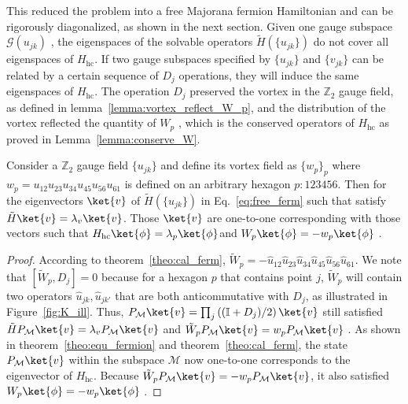 This reduced the problem into a free Majorana fermion Hamiltonian and can be rigorously diagonalized, as shown in the next section.
Given one gauge subspace $\mathcal{G}(u_{jk}) $ , the eigenspaces of the solvable operators $\tilde H(\{u_{jk}\})$ do not cover all eigenspaces of $H_{\mathrm{hc}}$.  
If two gauge subspaces specified by $\{u_{jk}\}$ and $\{v_{jk}\}$ can be related by a certain sequence of $D_j$ operations, they will induce the same eigenspaces of $H_{\mathrm{hc}}$.
The operation $D_j$ preserved the vortex in the $\mathbb{Z}_2$ gauge field, as defined in lemma~\ref{lemma:vortex_reflect_W_p}, and the distribution of the vortex reflected the quantity of $W_p$ , which is the conserved operators of $H_{\mathrm{hc}}$ as proved in Lemma~\ref{lemma:conserve_W}. 
\begin{lemma}\label{lemma:vortex_reflect_W_p}
    Consider a $\mathbb{Z}_2$ gauge field $\{u_{jk}\}$ and define its vortex field as $\{w_p\}_p$ where $w_p = u_{12}u_{23}u_{34}u_{45}u_{56}u_{61}$ is defined on an arbitrary hexagon $p:123456$. 
    Then for the eigenvectors $\ket{v}$ of $\tilde H(\{u_{jk}\})$ in Eq.~\eqref{eq:free_ferm} such that satisfy $\tilde H \ket{v} = \lambda_v \ket{v}$. Those $\ket{v}$ are one-to-one corresponding with those vectors such that $H_{\mathrm{hc}} \ket{\phi} = \lambda_{p} \ket{\phi}$and $W_p\ket{\phi} = -w_p \ket{\phi}$ . 
\end{lemma}
\begin{proof}
    According to theorem~\ref{theo:cal_ferm}, $\tilde W_p=-\hat{u}_{12}\hat{u}_{23}\hat{u}_{34}\hat{u}_{45}\hat{u}_{56}\hat{u}_{61}$.
    We note that $[\tilde W_p, D_j] = 0$ because for a hexagon $p$ that contains point $j$,  $\tilde W_p$ will contain two operators $\hat u_{jk}, \hat u_{jk'}$ that are both anticommutative with $D_j$, as illustrated in Figure~\ref{fig:K_ill}.
    Thus,  $ P_{\mathcal{M}}\ket{v}=\prod_j \left((\mathbb{I} + D_j)/{2}\right) \ket{v} $ still satisfied  $\tilde H P_{\mathcal{M}}\ket{v} = \lambda_v P_{\mathcal{M}}\ket{v}$ and $\tilde W_p  P_{\mathcal{M}}\ket{v} = w_{p}P_{\mathcal{M}}\ket{v}$ .
    As shown in theorem~\ref{theo:equ_fermion} and theorem~\ref{theo:cal_ferm}, the state $P_{\mathcal{M}}\ket{v}$ within the subspace $\mathcal{M}$ now one-to-one corresponds to the eigenvector of $H_{\mathrm{hc}}$. 
    Because $\tilde W_p  P_{\mathcal{M}}\ket{v} = -w_{p}P_{\mathcal{M}}\ket{v}$, it also satisfied  $W_p\ket{\phi} = -w_p \ket{\phi}$ .
    \end{proof}


